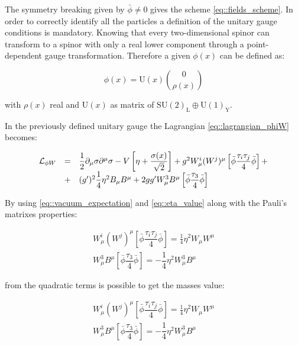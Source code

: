 The symmetry breaking given by $\bar{\phi} \neq 0$ gives the scheme \ref{eq::fields_scheme}.
In order to correctly identify all the particles a definition of the unitary gauge conditions is mandatory. Knowing that every two-dimensional spinor can transform to a spinor with only a real lower component through a point-dependent gauge transformation. Therefore a given $\phi(x)$
can be defined as:

\begin{equation}
\phi(x) = \text{U}(x) \binom{0}{\rho(x)}
\end{equation}

with $\rho(x)$ real and $\text{U}(x)$ as matrix of $ \text{SU}(2)_{\text{L}} \oplus \text{U}(1)_{\text{Y}}$. 

In the previously defined unitary gauge the Lagrangian \ref{eq::lagrangian_phiW} becomes:

\begin{equation}
\begin{array}{l c l}
\mathcal{L}_{\phi W}&=&\dfrac{1}{2} \partial_{\mu} \sigma \partial^{\mu} \sigma - V \left[ \eta + \dfrac{\sigma(x)}{\sqrt{2}}\right] + g^{2} W_{\mu}^{i}(W^{j})^{\mu} \left[ \bar{\phi} \dfrac{\tau_{i}\tau_{j}}{4}\bar{\phi}\right] +\\
&+&(g^{\prime})^{2} \dfrac{1}{4}\eta^{2} B_{\mu} B^{\mu} + 2 gg^{\prime} W^{3}_{\mu} B^{\mu} \left[ \bar{\phi} \dfrac{\tau_{3}}{4} \bar{\phi} \right]
\end{array}
\end{equation}

By using  \autoref{eq::vacuum_expectation} and \autoref{eq::eta_value} along with the Pauli's matrixes properties:

\begin{equation}
\begin{array}{c}
 W_{\mu}^{i}(W^{j})^{\mu} \left[ \bar{\phi} \dfrac{\tau_{i}\tau_{j}}{4}\bar{\phi}\right] = \frac{1}{4}\eta^{2} W_{\mu}W^{\mu} \\

 W^{3}_{\mu} B^{\mu} \left[ \bar{\phi} \dfrac{\tau_{3}}{4} \bar{\phi} \right] = - \dfrac{1}{4} \eta^{2} W^{3}_{\mu}B^{\mu}
 \end{array}
\end{equation}

from the quadratic terms is possible to get the masses value:

\begin{equation}
\begin{array}{c}
W_{\mu}^{i}(W^{j})^{\mu} \left[ \bar{\phi} \dfrac{\tau_{i}\tau_{j}}{4}\bar{\phi}\right] = \frac{1}{4}\eta^{2} W_{\mu}W^{\mu} \\

W^{3}_{\mu} B^{\mu} \left[ \bar{\phi} \dfrac{\tau_{3}}{4} \bar{\phi} \right] = - \dfrac{1}{4} \eta^{2} W^{3}_{\mu}B^{\mu}
\end{array}
\end{equation}

